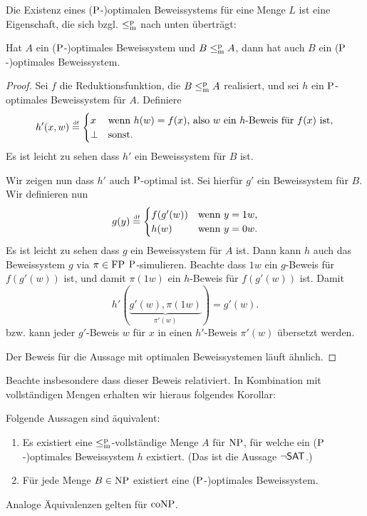 Die Existenz eines ($\P$-)optimalen Beweissystems für eine Menge $L$ ist eine Eigenschaft, die sich bzgl. $\leqmp$ nach unten überträgt:
\begin{lemma}\label{lemma:optimal-downward}
    Hat $A$ ein ($\P$-)optimales Beweissystem und $B\leqmp A$, dann hat auch $B$ ein ($\P$-)optimales Beweissystem.
\end{lemma}
\begin{proof}
    \strut{} Sei $f$ die Reduktionsfunktion, die $B\leqmp A$ realisiert, und 
    sei $h$ ein $\P$-optimales Beweissystem für $A$. Definiere
    \[ h'(x,w) \defeq \begin{cases} x & \text{wenn $h(w)=f(x)$, also $w$ ein $h$-Beweis für $f(x)$ ist},\\ \bot & \text{sonst.} \end{cases} \]
    Es ist leicht zu sehen dass $h'$ ein Beweissystem für $B$ ist.

    Wir zeigen nun dass $h'$ auch $\P$-optimal ist. Sei hierfür $g'$ ein Beweissystem für $B$. Wir definieren nun
    \[ g(y) \defeq \begin{cases} f(g'(w)) & \text{wenn $y=1w$,}\\ h(w) & \text{wenn $y=0w$.} \end{cases}\]
    Es ist leicht zu sehen dass $g$ ein Beweissystem für $A$ ist. Dann kann $h$ auch das Beweissystem $g$ via $\pi\in\FP$ $\P$-simulieren.
    Beachte dass $1w$ ein $g$-Beweis für $f(g'(w))$ ist, und damit $\pi(1w)$ ein $h$-Beweis für $f(g'(w))$ ist.
    Damit
    \[ h'(\underbrace{g'(w), \pi(1w)}_{\pi'(w)}) = g'(w). \]
    bzw. kann jeder $g'$-Beweis $w$ für $x$ in einen $h'$-Beweis $\pi'(w)$ übersetzt werden.

    Der Beweis für die Aussage mit optimalen Beweissystemen läuft ähnlich.
\end{proof}
Beachte insbesondere dass dieser Beweis relativiert.
In Kombination mit vollständigen Mengen erhalten wir hieraus folgendes Korollar:
\begin{corollary}
    Folgende Aussagen sind äquivalent:
    \begin{enumerate}
        \item Es existiert eine $\leqmp$-vollständige Menge $A$ für $\NP$, für welche ein ($\P$-)optimales Beweissystem $h$ existiert. (Das ist die Aussage $\neg\hSAT$.)
        \item Für jede Menge $B\in\NP$ existiert eine ($\P$-)optimales Beweissystem.
    \end{enumerate}
    Analoge Äquivalenzen gelten für $\coNP$.
\end{corollary}
